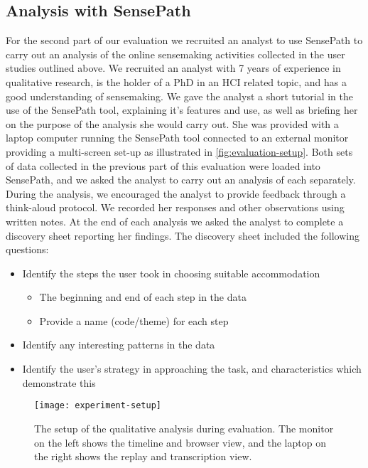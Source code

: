 \subsection{Analysis with SensePath}
For the second part of our evaluation we recruited an analyst to use SensePath to carry out an analysis of the online sensemaking activities collected in the user studies outlined above. We recruited an analyst with 7 years of experience in qualitative research, is the holder of a PhD in an HCI related topic, and has a good understanding of sensemaking. We gave the analyst a short tutorial in the use of the SensePath tool, explaining it's features and use, as well as briefing her on the purpose of the analysis she would carry out. She was provided with a laptop computer running the SensePath tool connected to an external monitor providing a multi-screen set-up as illustrated in \autoref{fig:evaluation-setup}. Both sets of data collected in the previous part of this evaluation were loaded into SensePath, and we asked the analyst to carry out an analysis of each separately. During the analysis, we encouraged the analyst to provide feedback through a think-aloud protocol. We recorded her responses and other observations using written notes. At the end of each analysis we asked the analyst to complete a discovery sheet reporting her findings. The discovery sheet included the following questions:
\begin{itemize}
	\item Identify the steps the user took in choosing suitable accommodation
		\begin{itemize}
			\item The beginning and end of each step in the data
			\item Provide a name (code/theme) for each step
		\end{itemize}
			\item Identify any interesting patterns in the data
			\item Identify the user's strategy in approaching the task, and characteristics which demonstrate this
\end{itemize}

\begin{figure}[ht]
\centering
\texttt{[image: experiment-setup]}
\caption{The setup of the qualitative analysis during evaluation. The monitor on the left shows the timeline and browser view, and the laptop on the right shows the replay and transcription view.}
\label{fig:evaluation-setup}
\end{figure}

